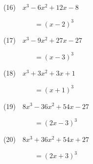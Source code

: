 \documentclass[a4j,twocolumn,10pt,fleqn]{jarticle}
\begin{document}
(16)~~$x^{3} - 6 x^{2} + 12 x - 8$

~~~~~~~~~$=\left(x - 2\right)^{3}$

(17)~~$x^{3} - 9 x^{2} + 27 x - 27$

~~~~~~~~~$=\left(x - 3\right)^{3}$

(18)~~$x^{3} + 3 x^{2} + 3 x + 1$

~~~~~~~~~$=\left(x + 1\right)^{3}$

(19)~~$8 x^{3} - 36 x^{2} + 54 x - 27$

~~~~~~~~~$=\left(2 x - 3\right)^{3}$

(20)~~$8 x^{3} + 36 x^{2} + 54 x + 27$

~~~~~~~~~$=\left(2 x + 3\right)^{3}$
\end{document}
